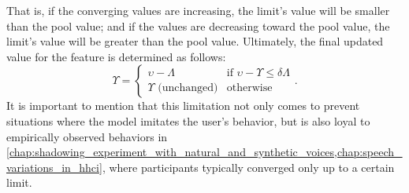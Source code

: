 \noindent
%
That is, if the converging values are increasing, the limit's value will be smaller than the pool value;
and if the values are decreasing toward the pool value, the limit's value will be greater than the pool value.
Ultimately, the final updated value for the feature is determined as follows:
%
\begin{equation}
	\label{eq:new_value}
	\Upsilon = 		
	\begin{cases}
		\upsilon - \Lambda & \text{if }\upsilon - \Upsilon \leq \delta\Lambda\\
		\Upsilon \text{ (unchanged)} & \text{otherwise}
	\end{cases}.
\end{equation}
\noindent
%
It is important to mention that this limitation not only comes to prevent situations where the model imitates the user's behavior, but is also loyal to empirically observed behaviors in \cref{chap:shadowing_experiment_with_natural_and_synthetic_voices,chap:speech_variations_in_hhci}, where participants typically converged only up to a certain limit.

